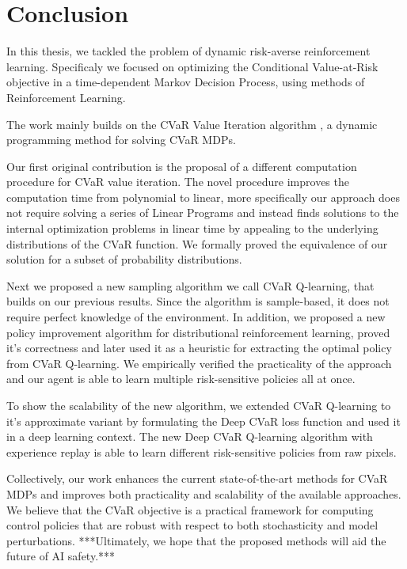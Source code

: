 \chapter{Conclusion}\label{ch:conclusion}

In this thesis, we tackled the problem of dynamic risk-averse reinforcement learning. Specificaly we focused on optimizing the Conditional Value-at-Risk objective in a time-dependent Markov Decision Process, using methods of Reinforcement Learning.

The work mainly builds on the CVaR Value Iteration algorithm \citep{chow2015risk}, a dynamic programming method for solving CVaR MDPs. 

Our first original contribution is the proposal of a different computation procedure for CVaR value iteration. The novel procedure improves the computation time from polynomial to linear, more specifically our approach does not require solving a series of Linear Programs and instead finds solutions to the internal optimization problems in linear time by appealing to the underlying distributions of the CVaR function. We formally proved the equivalence of our solution for a subset of probability distributions.

Next we proposed a new sampling algorithm we call CVaR Q-learning, that builds on our previous results. Since the algorithm is sample-based, it does not require perfect knowledge of the environment. 
In addition, we proposed a new policy improvement algorithm for distributional reinforcement learning, proved it's correctness and later used it as a heuristic for extracting the optimal policy from CVaR Q-learning. We empirically verified the practicality of the approach and our agent is able to learn multiple risk-sensitive policies all at once.

To show the scalability of the new algorithm, we extended CVaR Q-learning to it's approximate variant by formulating the Deep CVaR loss function and used it in a deep learning context. The new Deep CVaR Q-learning algorithm with experience replay is able to learn different risk-sensitive policies from raw pixels.


Collectively, our work enhances the current state-of-the-art methods for CVaR MDPs and improves both practicality and scalability of the available approaches. We believe that the CVaR objective is a practical framework for computing control policies that are robust with respect to both stochasticity and model perturbations. ***Ultimately, we hope that the proposed methods will aid the future of AI safety.***


